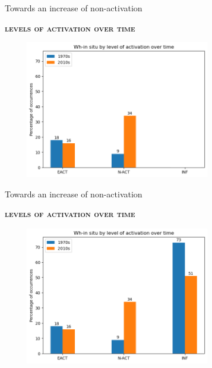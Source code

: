 \documentclass[lesson_slides]{subfiles}
\begin{document}
\begin{frame}[c]{Towards an increase of non-activation}

    \textbf{\textsc{levels of activation over time}}
    \begin{center}
        \includegraphics[width=10cm, height=6cm]{images/activations2.png}
    \end{center}
  
\end{frame}
\begin{frame}[c]{Towards an increase of non-activation}

    \textbf{\textsc{levels of activation over time}}
    \begin{center}
        \includegraphics[width=10cm, height=6cm]{images/activationsall.png}
    \end{center}
  
\end{frame}
\end{document}
